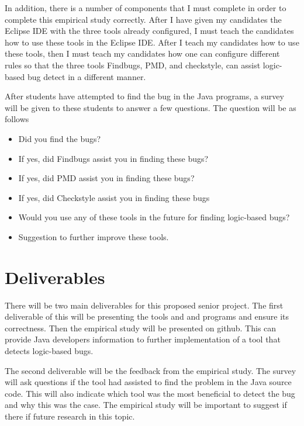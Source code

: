 In addition, there is a number of components that I must complete in order to complete this empirical study correctly. After I have given my candidates the Eclipse IDE with the three tools already configured, I must teach the candidates how to use these tools in the Eclipse IDE. After I teach my candidates how to use these tools, then I must teach my candidates how one can configure different rules so that the three tools Findbugs, PMD, and checkstyle, can assist logic-based bug detect in a different manner.

After students have attempted to find the bug in the Java programs, a survey will be given to these students to answer a few questions. The question will be as follows
\begin{itemize}
\item Did you find the bugs?
\item If yes, did Findbugs assist you in finding these bugs?
\item If yes, did PMD assist you in finding these bugs?
\item If yes, did Checkstyle assist you in finding these bugs
\item Would you use any of these tools in the future for finding logic-based bugs?
\item Suggestion to further improve these tools.
\end{itemize}


\section{Deliverables}
\label{sec:deliverables}

There will be two main deliverables for this proposed senior project. The first deliverable of this will be presenting the tools and and programs and ensure its correctness. Then the empirical study will be presented on github. This can provide Java developers information to further implementation of a tool that detects logic-based bugs.

The second deliverable will be the feedback from the empirical study. The survey will ask questions if the tool had assisted to find the problem in the Java source code. This will also indicate which tool was the most beneficial to detect the bug and why this was the case. The empirical study will be important to suggest if there if future research in this topic.

